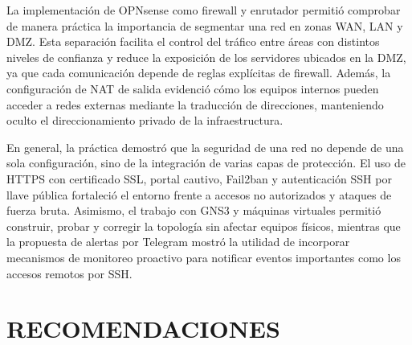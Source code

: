 \documentclass{article}
\renewcommand{\_}{\oldunderscore\hskip0pt\relax}
\begin{document}
La implementación de OPNsense como firewall y enrutador permitió comprobar de manera práctica la importancia de segmentar una red en zonas WAN, LAN y DMZ. Esta separación facilita el control del tráfico entre áreas con distintos niveles de confianza y reduce la exposición de los servidores ubicados en la DMZ, ya que cada comunicación depende de reglas explícitas de firewall. Además, la configuración de NAT de salida evidenció cómo los equipos internos pueden acceder a redes externas mediante la traducción de direcciones, manteniendo oculto el direccionamiento privado de la infraestructura.

En general, la práctica demostró que la seguridad de una red no depende de una sola configuración, sino de la integración de varias capas de protección. El uso de HTTPS con certificado SSL, portal cautivo, Fail2ban y autenticación SSH por llave pública fortaleció el entorno frente a accesos no autorizados y ataques de fuerza bruta. Asimismo, el trabajo con GNS3 y máquinas virtuales permitió construir, probar y corregir la topología sin afectar equipos físicos, mientras que la propuesta de alertas por Telegram mostró la utilidad de incorporar mecanismos de monitoreo proactivo para notificar eventos importantes como los accesos remotos por SSH.

\hypertarget{recomendaciones}{%
\section{RECOMENDACIONES}\label{recomendaciones}}
\end{document}
